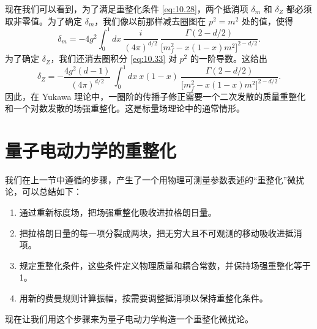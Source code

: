 现在我们可以看到，为了满足重整化条件 \eqref{eq:10.28}，两个抵消项 $\delta_m$ 和 $\delta_Z$ 都必须取非零值。为了确定 $\delta_m$，我们像以前那样减去圈图在 $p^2 = m^2$ 处的值，使得
\begin{equation}
  \delta_m = -4g^2\int_0^1 dx\ \frac{i}{(4\pi)^{d/2}}\ \frac{\Gamma(2-d/2)}
    {\bigl[ m_f^2 - x(1-x)m^2 \bigr]^{2-d/2}} .
  \label{eq:10.34}
\end{equation}
为了确定 $\delta_Z$，我们还消去圈积分 \eqref{eq:10.33} 对 $p^2$ 的一阶导数。这给出
\begin{equation}
  \delta_Z = -\frac{4g^2(d-1)}{(4\pi)^{d/2}}\ \int_0^1 dx\ x(1-x)\
    \frac{\Gamma(2-d/2)}{\bigl[ m_f^2 - x(1-x)m^2 \bigr]^{2-d/2}} .
  \label{eq:10.35}
\end{equation}
因此，在 Yukawa 理论中，一圈阶的传播子修正需要一个二次发散的质量重整化和一个对数发散的场强重整化。这是标量场理论中的通常情形。

\section{量子电动力学的重整化}

我们在上一节中遵循的步骤，产生了一个用物理可测量参数表述的``重整化''微扰论，可以总结如下：
\begin{enumerate}
  \item 通过重新标度场，把场强重整化吸收进拉格朗日量。
  \item 把拉格朗日量的每一项分裂成两块，把无穷大且不可观测的移动吸收进抵消项。
  \item 规定重整化条件，这些条件定义物理质量和耦合常数，并保持场强重整化等于 1。
  \item 用新的费曼规则计算振幅，按需要调整抵消项以保持重整化条件。
\end{enumerate}
现在让我们用这个步骤来为量子电动力学构造一个重整化微扰论。

